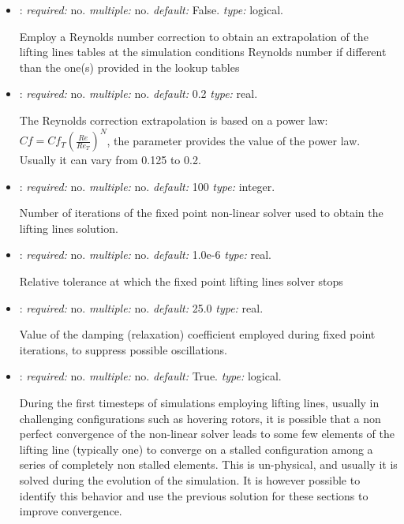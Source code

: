 \begin{itemize}
\item {}: \textit{required:} no. 
\textit{multiple:} no. \textit{default:} False. \textit{type:} logical.

Employ a Reynolds number correction to obtain an extrapolation of 
the lifting lines tables at the simulation conditions Reynolds number 
if different than the one(s) provided in the lookup tables

\item {}: \textit{required:} no. 
\textit{multiple:} no. \textit{default:} 0.2 \textit{type:} real.

The Reynolds correction extrapolation is based on a power law: 
$Cf = Cf_T \left(\frac{Re}{Re_T}\right)^N$, the parameter provides the 
value of the power law. Usually it can vary from 0.125 to 0.2.

\item {}: \textit{required:} no. \textit{multiple:} no. 
\textit{default:} 100 \textit{type:} integer.

Number of iterations of the fixed point non-linear solver used to obtain 
the lifting lines solution.

\item {}: \textit{required:} no. \textit{multiple:} no. 
\textit{default:} 1.0e-6 \textit{type:} real.

Relative tolerance at which the fixed point lifting lines solver stops

\item {}: \textit{required:} no. \textit{multiple:} no. 
\textit{default:} 25.0 \textit{type:} real.

Value of the damping (relaxation) coefficient employed during fixed point 
iterations, to suppress possible oscillations.

\item {}: \textit{required:} no. 
\textit{multiple:} no. \textit{default:} True. \textit{type:} logical.

During the first timesteps of simulations employing lifting lines, 
usually in challenging configurations such as hovering rotors, 
it is possible that a non perfect convergence of the non-linear 
solver leads to some few elements of the lifting line (typically one) 
to converge on a stalled configuration among a series of completely 
non stalled elements. This is un-physical, and usually it is solved 
during the evolution of the simulation. It is however possible to 
identify this behavior and use the previous solution for these 
sections to improve convergence. 


\end{itemize}
